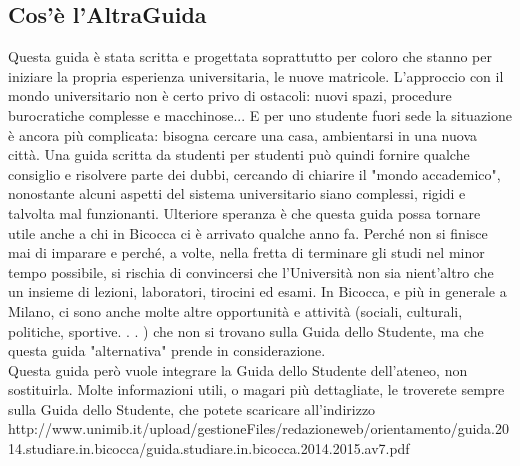 
\subsection{Cos’è l’AltraGuida}
Questa guida è stata scritta e progettata soprattutto per coloro che stanno per iniziare la propria esperienza universitaria, le nuove matricole. L'approccio con il mondo universitario non è certo privo di ostacoli: nuovi spazi, procedure burocratiche complesse e macchinose... E per uno studente fuori sede la situazione è ancora più complicata: bisogna cercare una casa, ambientarsi in una nuova città.
Una guida scritta da studenti per studenti può quindi fornire qualche consiglio e risolvere parte dei dubbi, cercando di chiarire il "mondo accademico", nonostante alcuni aspetti del sistema universitario siano complessi, rigidi e talvolta mal funzionanti. Ulteriore speranza è che questa guida possa tornare utile anche a chi in Bicocca ci è arrivato qualche anno fa. Perché non si finisce mai di imparare e perché, a volte, nella fretta di terminare gli studi nel minor tempo possibile, si rischia di convincersi che l'Università non sia nient'altro che un insieme di lezioni, laboratori, tirocini ed esami. In Bicocca, e più in generale a Milano, ci sono anche molte altre opportunità e attività (sociali, culturali, politiche, sportive. . . ) che non si trovano sulla Guida dello Studente, ma che questa guida "alternativa" prende in considerazione.\\
\linebreak
Questa guida però vuole integrare la Guida dello Studente dell'ateneo, non sostituirla. Molte informazioni utili, o magari più dettagliate, le troverete sempre sulla Guida dello Studente, che potete scaricare all'indirizzo 
http://www.unimib.it/upload/gestioneFiles/redazioneweb/orientamento/guida.2014.studiare.in.bicocca/guida.studiare.in.bicocca.2014.2015.av7.pdf
 
